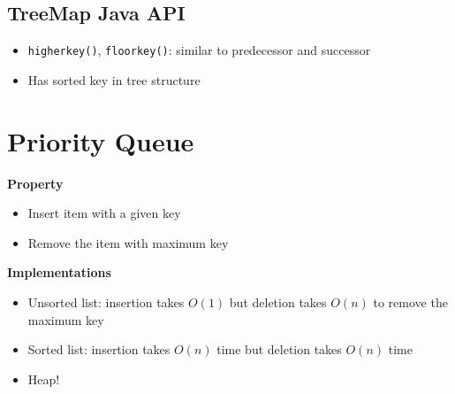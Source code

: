 \documentclass{article}
\begin{document}
\begin{multicols}{2}
\subsection{TreeMap Java API}
\begin{itemize}
	\item \texttt{higherkey()}, \texttt{floorkey()}: similar to predecessor and successor
	\item Has sorted key in tree structure
\end{itemize}

\section{Priority Queue}
\textbf{Property}
\begin{itemize}
	\item Insert item with a given key
	\item Remove the item with maximum key
\end{itemize}
\textbf{Implementations}
\begin{itemize}
	\item Unsorted list: insertion takes $O(1)$ but deletion takes $O(n)$ to remove the maximum key
	\item Sorted list: insertion takes $O(n)$ time but deletion takes $O(n)$ time
	\item Heap!
\end{itemize}

\end{multicols}
\end{document}
